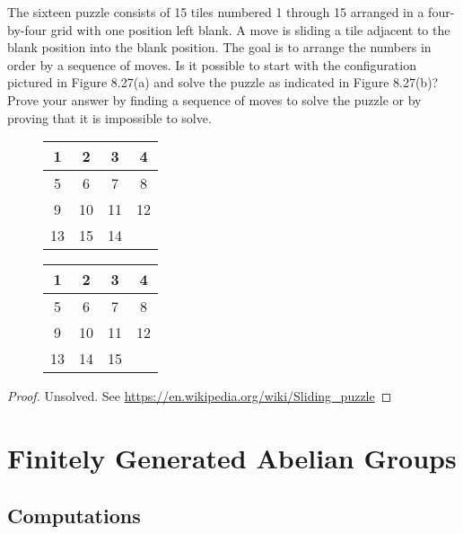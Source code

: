 \begin{exercise}
    The sixteen puzzle consists of 15 tiles numbered 1 through 15 arranged in a four-by-four grid with one position left blank. A move is sliding a tile adjacent to the blank position into the blank position. The goal is to arrange the numbers in order by a sequence of moves. Is it possible to start with the configuration pictured in Figure 8.27(a) and solve the puzzle as indicated in Figure 8.27(b)? Prove your answer by finding a sequence of moves to solve the puzzle or by proving that it is impossible to solve.
    \begin{figure}[htp]
        \centering
        \begin{tabular}{|c|c|c|c|}
            \hline
            1  & 2  & 3  & 4  \\
            \hline
            5  & 6  & 7  & 8  \\
            \hline
            9  & 10 & 11 & 12 \\
            \hline
            13 & 15 & 14 &    \\
            \hline
        \end{tabular}
        \hspace{2cm}
        \begin{tabular}{|c|c|c|c|}
            \hline
            1  & 2  & 3  & 4  \\
            \hline
            5  & 6  & 7  & 8  \\
            \hline
            9  & 10 & 11 & 12 \\
            \hline
            13 & 14 & 15 &    \\
            \hline
        \end{tabular}
    \end{figure}
\end{exercise}

\begin{proof}
    Unsolved. See \url{https://en.wikipedia.org/wiki/Sliding_puzzle}
\end{proof}

\section{Finitely Generated Abelian Groups}

\subsection*{Computations}

